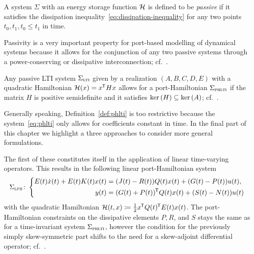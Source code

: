 \begin{definition}\label{def:passivity}
    A system $\Sigma$ with an energy storage function $\mathcal{H}$ is defined to be \emph{passive} if it satisfies the dissipation inequality~\eqref{eq:dissipation-inequality} for any two points $t_0, t_1, t_0 \leq t_1$ in time.
\end{definition}

\begin{remark}
    Passivity is a very important property for port-based modelling of dynamical systems because it allows for the conjunction of any two passive systems through a power-conserving or dissipative interconnection; cf.~\cite{Mehrmann2022, Morandin2022}.
\end{remark}

\begin{remark}
    Any passive LTI system $\Sigma_{\textsc{lti}}$ given by a realization $(A, B, C, D, E)$ with a quadratic Hamiltonian $\mathcal{H}(x) = x^{\mkern-1.5mu \mathsf{T}} H x$ allows for a port-Hamiltonian $\Sigma_{\textsc{phlti}}$ if the matrix $H$ is positive semidefinite and it satisfies $\mathop{}\!\mathrm{ker}\left(H\right) \subseteq \mathop{}\!\mathrm{ker}\left(A\right)$; cf.~\cite[Theorem~7.1]{VanDerSchaft2014}.
\end{remark}

Generally speaking, Definition~\ref{def:phlti} is too restrictive because the system~\eqref{eq:phlti} only allows for coefficients constant in time.
In the final part of this chapter we highlight a three approaches to consider more general formulations.

\begin{remark}
    The first of these constitutes itself in the application of linear time-varying operators.
    This results in the following linear port-Hamiltonian system
    \begin{equation}\label{eq:lph}
        \Sigma_{\textsc{lph}} \colon \left\lbrace
        \begin{aligned}
            E(t) \dot{x}(t) + E(t) K(t) x(t) &= (J(t) - R(t)) Q(t) x(t) + (G(t) - P(t)) u(t), \\
            y(t) &= (G(t) + P(t))^{\mkern-1.5mu \mathsf{T}} Q(t) x(t) + (S(t) - N(t)) u(t)
        \end{aligned}
        \right.
    \end{equation}
    with the quadratic Hamiltonian $\mathcal{H}(t, x) \coloneqq \frac{1}{2} x^{\mkern-1.5mu \mathsf{T}} Q(t)^{\mkern-1.5mu \mathsf{T}} E(t) x(t)$.
    The port-Hamiltonian constraints on the dissipative elements $P, R$, and $S$ stays the same as for a time-invariant system $\Sigma_{\textsc{phlti}}$, however the condition for the previously simply skew-symmetric part shifts to the need for a skew-adjoint differential operator; cf.~\cite[Definition~4.8]{Mehrmann2022}.
\end{remark}

